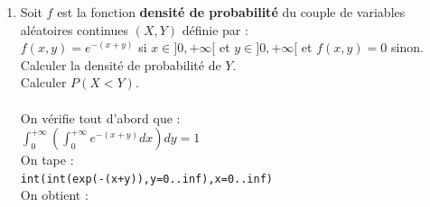 \documentclass[a4paper,11pt]{book}
\begin{document}
\begin{enumerate}
\begin{enumerate}
\item $P(X>Y)$.\\
On a si $T=\{((x,y) \in [0,1]\times[0,2];\ x>y \}$:\\
$P(X>Y)=\int\int_Tf(x,y)dxdy$
$T$ est le triangle rectangle isoc\`ele de sommets $(0,0),(1,0),(1,1)$ donc :\\
$P(X>Y)=\int_0^1\int_0^xf(x,y)dxdy$\\
On tape :\\
{\tt 6/7*int(int(x\verb|^|2+x*y/2,y=0..x),x=0..1)}\\
On obtient : {\tt 15/56}\\
\item $P(Y>1/2|X<1/2)$.
On a :\\
$\displaystyle P(Y>1/2|X<1/2)=\frac{P((Y>1/2) \cap (X<1/2))}{P(X<1/2)}$\\
On a d\'eja calculer $P(X<1/2)$ :\\
$P(X<1/2)=F_X(1/2)$\\
On tape :\\
{\tt subst((6*(2/3*x\verb|^|3+1/2*x\verb|^|2))/7,x=1/2)}\\
On obtient : {\tt 5/28}
On calcule $P((Y>1/2) \cap (X<1/2))$ :\\
$P((Y>1/2) \cap (X<1/2))=\int_0^{1/2}(\int_{1/2}^2f(x,y)dy)dx$\\
On tape :\\
{\tt 6/7*int(int(x\verb|^|2+x*y/2,y=1/2..2),x=0..1/2)}\\
On obtient : {\tt 69/448}\\
Donc :\\
$P(Y>1/2|X<1/2)=(69/448)/(5/28)=69/80$
\end{enumerate}
\item Soit  $f$ est la fonction {\bf densit\'e de probabilit\'e} du couple de 
variables al\'eatoires continues $(X,Y)$ d\'efinie par :\\
$\displaystyle f(x,y)=e^{-(x+y)}$ si $x\in ]0,+\infty[$ et $y\in ]0,+\infty[$ et $f(x,y)=0$ sinon.\\
Calculer la densit\'e de probabilit\'e de $Y$.\\
Calculer  $P(X<Y)$.\\
\ \\
On v\'erifie tout d'abord que :\\
$\int_0^{+\infty}(\int_0^{+\infty} e^{-(x+y)}dx)dy=1$\\
On tape :\\
{\tt int(int(exp(-(x+y)),y=0..inf),x=0..inf)}\\
On obtient :\\

\end{enumerate}
\end{document}
